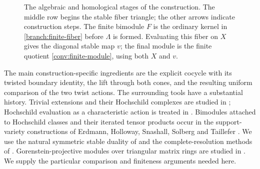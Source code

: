 \begin{figure}[ht]
\centering
{}
\caption{The algebraic and homological stages of the construction.
The middle row begins the stable fiber triangle; the other arrows indicate
construction steps. The finite bimodule $F$ is the ordinary kernel in
\eqref{branch:finite-fiber} before $\Lambda$ is formed. Evaluating this
fiber on $X$ gives the diagonal stable map $v$; the final module is
the finite quotient \eqref{conv:finite-module}, using both $X$ and $v$.}\label{fig:construction}
\end{figure}

The main construction-specific ingredients are the explicit cocycle
with its twisted boundary identity, the lift through both cones, and
the resulting uniform comparison of the two twist actions. The
surrounding tools have a substantial history. Trivial extensions and
their Hochschild complexes are studied in
\cite{CibilsMarcosRedondoSolotar2003}; Hochschild evaluation as a
characteristic action is treated in \cite[Section~4.3]{Lowen2008}.
Bimodules attached to Hochschild classes and their iterated tensor products
occur in the support-variety constructions of Erdmann, Holloway,
Snashall, Solberg and Taillefer \cite[Section~2]{ErdmannEtAl2003}.
We use the natural symmetric stable duality of
\cite[Section 2]{Linckelmann2013} and the complete-resolution methods
of \cite{Veliche2006}. Gorenstein-projective modules over triangular
matrix rings are studied in \cite{EshraghiEtAl2014}. We supply the
particular comparison and finiteness arguments needed here.

